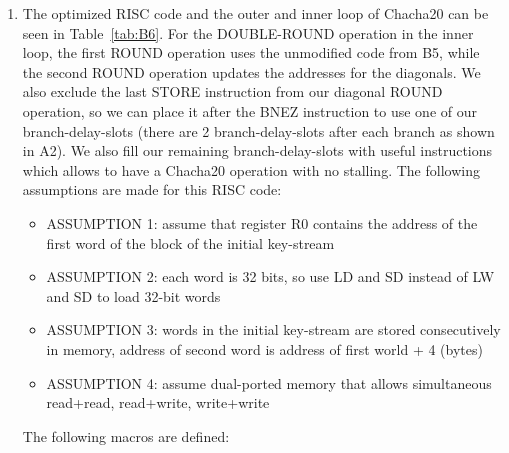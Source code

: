 \begin{enumerate}[wide, label=(B\arabic*)]
\item The optimized RISC code and the outer and inner loop of Chacha20 can be seen in Table~\ref{tab:B6}. For the DOUBLE-ROUND operation in the inner loop, the first ROUND operation uses the unmodified code from B5, while the second ROUND operation updates the addresses for the diagonals. We also exclude the last STORE instruction from our diagonal ROUND operation, so we can place it after the BNEZ instruction to use one of our branch-delay-slots (there are 2 branch-delay-slots after each branch as shown in A2). We also fill our remaining branch-delay-slots with useful instructions which allows to have a Chacha20 operation with no stalling. The following assumptions are made for this RISC code:
\begin{itemize}
	\item ASSUMPTION 1: assume that register R0 contains the address of the first word of the block of the initial key-stream
	\item ASSUMPTION 2: each word is 32 bits, so use LD and SD instead of LW and SD to load 32-bit words
	\item ASSUMPTION 3: words in the initial key-stream are stored consecutively in memory, address of second word is address of first world + 4 (bytes)
	\item ASSUMPTION 4: assume dual-ported memory that allows simultaneous read+read, read+write, write+write
\end{itemize}
The following macros are defined:



\end{enumerate}
